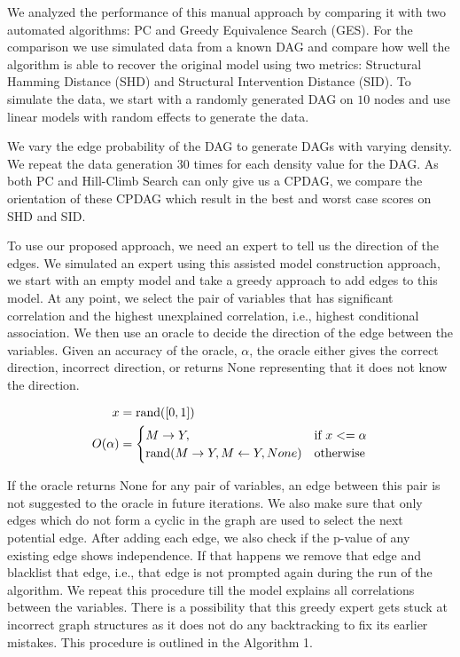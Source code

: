 \documentclass[letterpaper]{article} %
\begin{document}
We analyzed the performance of this manual approach by comparing it with two
automated algorithms: PC and Greedy Equivalence Search (GES). For the
comparison we use simulated data from a known DAG and compare how well the
algorithm is able to recover the original model using two metrics: Structural
Hamming Distance (SHD) and Structural Intervention Distance (SID). To simulate
the data, we start with a randomly generated DAG on $ 10 $ nodes and use linear
models with random effects to generate the data. 

We vary the edge probability of the DAG to generate DAGs with varying density.
We repeat the data generation $ 30 $ times for each density value for the DAG.
As both PC and Hill-Climb Search can only give us a CPDAG, we compare the
orientation of these CPDAG which result in the best and worst case scores on
SHD and SID.

To use our proposed approach, we need an expert to tell us the direction of the
edges. We simulated an expert using this assisted model construction approach,
we start with an empty model and take a greedy approach to add edges to this
model. At any point, we select the pair of variables that has significant
correlation and the highest unexplained correlation, i.e., highest conditional
association. We then use an oracle to decide the direction of the edge between
the variables. Given an accuracy of the oracle, $ \alpha $, the oracle either
gives the correct direction, incorrect direction, or returns None representing
that it does not know the direction.

\begin{equation}
	\begin{split}
		x &= \textnormal{rand}([0, 1]) \\
		O(\alpha) &= \begin{cases} 
			M \rightarrow Y, & \textnormal{if  } x <= \alpha \\
			\textnormal{rand}(M \rightarrow Y, M \leftarrow Y, None) & \textnormal{otherwise} \\
				\end{cases} \\
	\end{split}
\end{equation}

If the oracle returns None for any pair of variables, an edge between this pair
is not suggested to the oracle in future iterations. We also make sure that
only edges which do not form a cyclic in the graph are used to select the next
potential edge. After adding each edge, we also check if the p-value of any
existing edge shows independence. If that happens we remove that edge and
blacklist that edge, i.e., that edge is not prompted again during the run of
the algorithm. We repeat this procedure till the model explains all
correlations between the variables. There is a possibility that this greedy
expert gets stuck at incorrect graph structures as it does not do any
backtracking to fix its earlier mistakes. This procedure is outlined in the
Algorithm 1.
\end{document}
